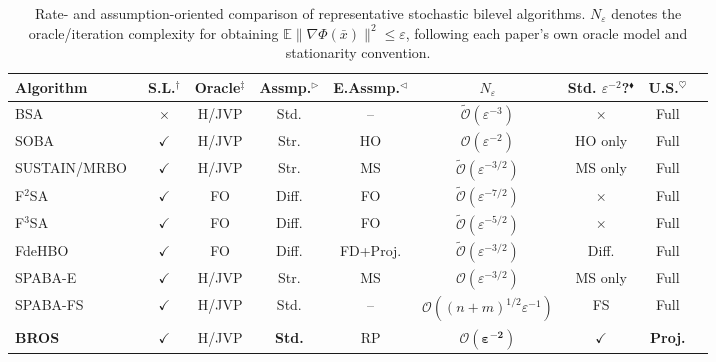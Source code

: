\documentclass{pkumelon}
\theoremstyle{plain}
\newcommand{\oursname}{\textnormal{\textbf{BROS}}}
\newcommand{\ourslast}{\oursname}
\begin{document}
\begin{table}[t!]
\centering
\small
\setlength{\tabcolsep}{3pt}
\renewcommand{\arraystretch}{1.14}
\caption{
Rate- and assumption-oriented comparison of representative stochastic bilevel algorithms.
$N_\varepsilon$ denotes the oracle/iteration complexity for obtaining
$\mathbb E\|\nabla\Phi(\bar x)\|^2\le \varepsilon$, following each paper's own oracle model and stationarity convention.
}
\label{tab:intro-positioning}
\begin{threeparttable}
\begin{tabular}{lcccccccc}
\toprule
Algorithm
& S.L.$^\dagger$
& Oracle$^\ddagger$
& Assmp.$^\triangleright$
& E.Assmp.$^\triangleleft$
& $N_\varepsilon$
& Std. $\varepsilon^{-2}$?$^\blacklozenge$
& U.S.$^\heartsuit$\\
\midrule

BSA~\citep{ghadimi2018approximation}
& $\times$
& H/JVP
& Std.
& --
& $\widetilde{\mathcal O}(\varepsilon^{-3})$
& $\times$
& Full\\

SOBA~\citep{dagreou2022framework}
& $\checkmark$
& H/JVP
& Str.
& HO
& $\mathcal O(\varepsilon^{-2})$
& HO only
& Full\\

SUSTAIN/MRBO~\citep{khanduri2021near,yang2021provably}
& $\checkmark$
& H/JVP
& Str.
& MS
& $\widetilde{\mathcal O}(\varepsilon^{-3/2})$
& MS only
& Full\\

F$^2$SA~\citep{kwon2023fully}
& $\checkmark$
& FO
& Diff.
& FO
& $\widetilde{\mathcal O}(\varepsilon^{-7/2})$
& $\times$
& Full\\

F$^3$SA~\citep{kwon2023fully}
& $\checkmark$
& FO
& Diff.
& FO
& $\widetilde{\mathcal O}(\varepsilon^{-5/2})$
& $\times$
& Full\\

FdeHBO~\citep{yang2023achieving}
& $\checkmark$
& FO
& Diff.
& FD+Proj.
& $\widetilde{\mathcal O}(\varepsilon^{-3/2})$
& Diff.
& Full\\

SPABA-E~\citep{chu2024spaba}
& $\checkmark$
& H/JVP
& Str.
& MS
& $\mathcal O(\varepsilon^{-3/2})$
& MS only
& Full \\

SPABA-FS~\citep{chu2024spaba}
& $\checkmark$
& H/JVP
& Std.
& --
& $\mathcal O((n+m)^{1/2}\varepsilon^{-1})$
& FS
& Full\\

\midrule
\rowcolor{boxbg}
\textbf{\ourslast}
& $\checkmark$
& H/JVP
& \textbf{Std.}
& RP
& $\mathbf{\mathcal O(\varepsilon^{-2})}$
& $\checkmark$
& \textbf{Proj.}\\


\end{tabular}
\end{threeparttable}
\end{table}
\end{document}
